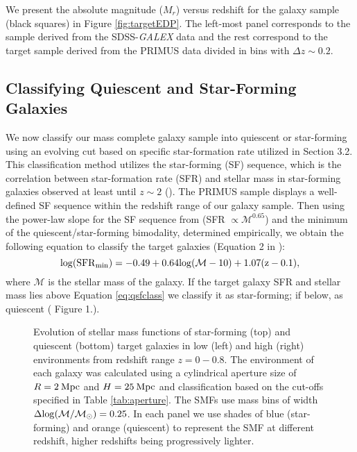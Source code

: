 \documentclass{emulateapj}
\begin{document}
We present the absolute magnitude ($M_{r}$) versus redshift for the galaxy sample (black squares) in Figure \ref{fig:targetEDP}. The left-most panel corresponds to the sample derived from the SDSS-{\em GALEX} data and the rest correspond to the target sample derived from the PRIMUS data divided in bins with $\Delta z \sim 0.2$. 
\subsection{Classifying Quiescent and Star-Forming Galaxies} \label{sec:sfq}
We now classify our mass complete galaxy sample into quiescent or star-forming using an evolving cut based on specific star-formation rate utilized in \cite{Moustakas:2013aa} Section 3.2. This classification method utilizes the star-forming (SF) sequence, which is the correlation between star-formation rate (SFR) and stellar mass in star-forming galaxies observed at least until $z \sim 2$ (\cite{Noeske:2007aa}). The PRIMUS sample displays a well-defined SF sequence within the redshift range of our galaxy sample. Then using the power-law slope for the SF sequence from \cite{Salim:2007aa} (SFR $\propto \mathcal{M}^{0.65}$) and the minimum of the quiescent/star-forming bimodality, determined empirically, we obtain the following equation to classify the target galaxies (Equation 2 in \cite{Moustakas:2013aa}):
\begin{equation}
\rm{log}(\rm{SFR}_{\rm{min}}) = -0.49 + 0.64 \rm{log}(\mathcal{M} - 10) +1.07(z-0.1), 
\end{equation} \label{eq:qsfclass} 
where $\mathcal{M}$ is the stellar mass of the galaxy. If the target galaxy SFR and stellar mass lies above Equation \ref{eq:qsfclass} we classify it as star-forming; if below, as quiescent (\cite{Moustakas:2013aa} Figure 1.).

\begin{figure*}
  \begin{center}
    \leavevmode
     \caption{Evolution of stellar mass functions of star-forming (top) and quiescent (bottom) target galaxies in 
low (left) and high (right) environments from redshift range $z=0-0.8$. The environment of each galaxy  
was calculated using a cylindrical aperture size of $R=2 \: \rm{Mpc}$ and $H=25 \: \rm{Mpc}$ and  
classification based on the cut-offs specified in Table \ref{tab:aperture}. The SMFs use mass bins of 
width $\Delta \rm{log}(\mathcal{M}/\mathcal{M}_{\odot})=0.25$. In each panel we use shades of blue 
(star-forming) and orange (quiescent) to represent the SMF at different redshift, higher redshifts being
progressively lighter.}      \label{fig:smf}
    \end{center}
\end{figure*}
\end{document}

